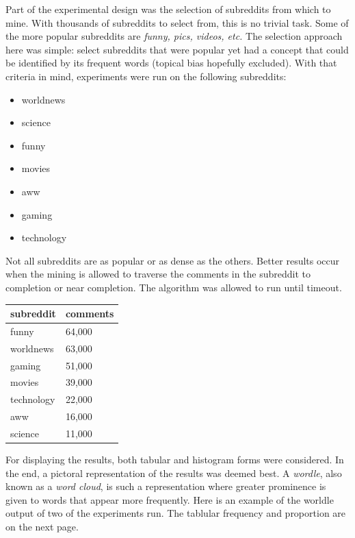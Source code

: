 \documentclass[12pt]{article}
\numberwithin{equation}{section}
\begin{document}
Part of the experimental design was the selection of subreddits from which to mine.  With thousands of subreddits to select from, this is no trivial task.  Some of the more popular subreddits are \textit{funny, pics, videos, etc.}  The selection approach here was simple:  select subreddits that were popular yet had a concept that could be identified by its frequent words (topical bias hopefully excluded).   With that criteria in mind, experiments were run on the following subreddits: 

\begin{itemize} \itemsep1pt \parskip0pt 

  \item worldnews
  \item science
  \item funny
  \item movies
  \item aww
  \item gaming
  \item technology
  
\end{itemize}

Not all subreddits are as popular or as dense as the others.  Better results occur when the mining is allowed to traverse the comments in the subreddit to completion or near completion.  The algorithm was allowed to run until timeout.  

\begin{table}[h!]
\begin{tabular}{ll}
\textbf{subreddit} & \textbf{comments} \\
 \hline
funny              & 64,000           \\
worldnews          & 63,000           \\
gaming             & 51,000           \\
movies             & 39,000           \\
technology         & 22,000           \\
aww                & 16,000           \\
science            & 11,000          
\end{tabular}
\end{table}



For displaying the results, both tabular and histogram forms were considered.  In the end, a pictoral representation of the results was deemed best.  A \textit{wordle}, also known as a \textit{word cloud}, is such a representation where  greater prominence is given to words that appear more frequently.  Here is an example of the worldle output of two of the experiments run.  The tablular frequency and proportion are on the next page. 
\end{document}
